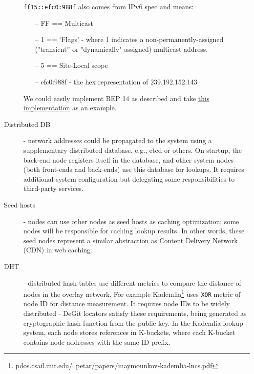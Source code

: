 \documentclass[acmlarge, screen, nonacm]{acmart}
\newcommand{\code}[1]{\texttt{#1}}
\begin{document}
\begin{description}
    \code{ff15::efc0:988f} also comes from \href{http://tools.ietf.org/html/rfc4291#section-2.7}{IPv6 spec} and means:
    \begin{itemize}
      \item[--] FF == Multicast
      \item[--] 1 == ‘Flags' - where 1 indicates a non-permanently-assigned ("transient” or "dynamically" assigned) multicast address.
      \item[--] 5 == Site-Local scope
      \item[--] efc0:988f - the hex representation of 239.192.152.143
    \end{itemize}
    We could easily implement BEP 14 as described and take \href{https://github.com/transmission/transmission/blob/7f147c65fb07a6baed3d079703ff0a31d1b1ca4c/libtransmission/tr-lpd.c}{this implementation} as an example.
  \item[Distributed DB] - network addresses could be propagated to the system using a supplementary distributed
    database, e.g., etcd or others. On startup, the back-end node registers itself in the database,
    and other system nodes (both front-ends and back-ends) use this database for lookups. 
    It requires additional system configuration but delegating some responsibilities to third-party services.
  \item[Seed hosts] - nodes can use other nodes as seed hosts as caching optimization; some nodes
    will be responsible for caching lookup results. In other words, these seed nodes represent a similar abstraction
    as Content Delivery Network (CDN) in web caching.
  \item[DHT] - distributed hash tables use different metrics to compare the distance of nodes in the overlay network.
    For example Kademlia\footnote{pdos.csail.mit.edu/~petar/papers/maymounkov-kademlia-lncs.pdf} uses
    \code{XOR} metric of node ID for distance measurement. It requires node IDs to be widely distributed -
    DeGit locators satisfy these requirements, being generated as cryptographic hash function from
    the public key. In the Kademlia lookup system, each node stores references in K-buckets, where each K-bucket
    contains node addresses with the same ID prefix.
\end{description}
\end{document}

